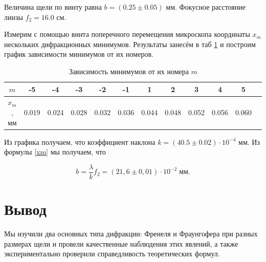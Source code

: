\documentclass[a4paper,12pt]{article}
\theoremstyle{definition}
\begin{document}
Величина щели по винту равна $ b = (0.25\pm0.05)$ мм. Фокусное расстояние линзы $ f_2 = 16.0$ см.

Измерим с помощью винта поперечного перемещения микроскопа координаты $ x_m $ нескольких дифракционных минимумов.
Результаты занесём в таб \ref{tab2} и построим график зависимости минимумов от их номеров. 

\begin{table}[!ht]
	\caption{Зависимость минимумов от их номера $ m $}
	\begin{center}
		\begin{tabular}{|c|c|c|c|c|c|c|c|c|c|c|c|} \hline
			$m$ & -5& -4 &-3 & -2 & -1 & 1 & 2 & 3 & 4 &5\\ \hline
			$ x_m $, мм  & 0.019 & 0.024 & 0.028 & 0.032 & 0.036 & 0.044 & 0.048 & 0.052 & 0.056 & 0.060\\ \hline
		\end{tabular}
	\end{center}
	\label{tab2}
\end{table}

\begin{figure}[H]
	\label{pic:5}
\end{figure}

Из графика получаем, что коэффициент наклона $ k = (40.5 \pm 0.02) \cdot 10^{-4}  $ мм. Из формулы \eqref{xm} мы получаем, что 

\begin{equation}\label{qqq}
b =  \dfrac{\lambda}{k} f_2 =  (21,6 \pm 0,01) \cdot 10^{-2} \; \text{мм}. 
\end{equation}

\section{Вывод}
Мы изучили два основных типа дифракции: Френеля и Фраунгофера при разных размерах щели и провели качественные наблюдения этих явлений, а также экспериментально проверили справедливость теоретических формул.
\end{document}
